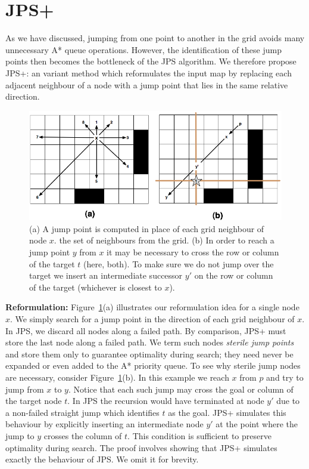 \section{JPS+}
\label{sec:pre}
As we have discussed, jumping from one point to another in the grid
avoids many unnecessary A* queue operations. However, the identification
of these jump points then becomes the bottleneck of the JPS algorithm. 
We therefore propose JPS+: an variant method which reformulates
the input map by replacing each adjacent neighbour of a node with
a jump point that lies in the same relative direction.

\begin{figure}[tb]
       \begin{center}
		   \includegraphics[width=0.95\columnwidth]
			{diagrams/preproc.png}
       \end{center}
	\vspace{-3pt}
       \caption{(a) A jump point is computed in place of each grid neighbour of node $x$.
		the set of neighbours from the grid. (b) In order to reach a jump point $y$ from $x$ it may be
necessary to cross the row or column of the target $t$ (here, both). To make sure we do not jump over 
the target we insert an intermediate successor $y'$ on the row or column of the target (whichever is closest to $x$).}
       \label{fig:preproc}
\end{figure}

\textbf{Reformulation:} 
Figure~\ref{fig:preproc}(a) illustrates our reformulation idea for a 
single node $x$. We simply search for a jump point in the direction
of each grid neighbour of $x$. In JPS, we discard all nodes along a failed
path. By comparison, JPS+ must store the last node along a failed path.
We term such nodes \emph{sterile jump points} and store them only
to guarantee optimality during search; they need never be expanded or even
added to the A* priority queue.
To see why sterile jump nodes are necessary, consider Figure~\ref{fig:preproc}(b).
In this example we reach $x$ from $p$ and try to jump from $x$ to $y$. 
Notice that each such jump may cross the goal or column of the target node
$t$. In JPS the recursion would have terminated at node $y'$ due to a non-failed
straight jump which identifies $t$ as the goal. 
JPS+ simulates this behaviour by explicitly inserting an intermediate node $y'$ 
at the point where the jump to $y$ crosses the column of $t$.
This condition is sufficient to preserve optimality during search. The proof
involves showing that JPS+ simulates exactly the behaviour of JPS. We omit it 
for brevity.

%


